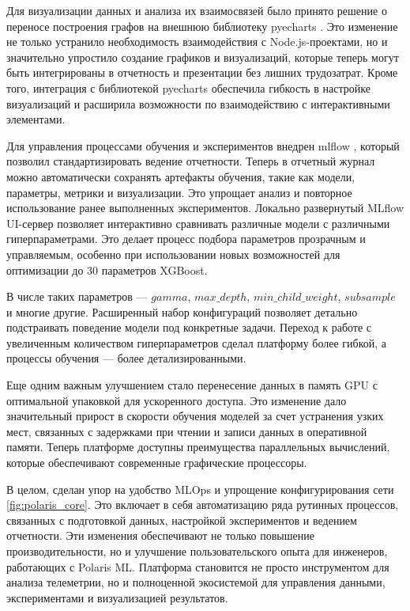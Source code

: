 \documentclass[14pt, a4paper]{src/bsu}
\begin{document}
Для визуализации данных и анализа их взаимосвязей было принято решение о
переносе построения графов на внешнюю библиотеку pyecharts
\cite{pyecharts_docs}. Это изменение не только устранило необходимость
взаимодействия с Node.js-проектами, но и значительно упростило создание
графиков и визуализаций, которые теперь могут быть интегрированы в отчетность и
презентации без лишних трудозатрат. Кроме того, интеграция с библиотекой
pyecharts обеспечила гибкость в настройке визуализаций и расширила возможности
по взаимодействию с интерактивными элементами.

Для управления процессами обучения и экспериментов внедрен mlflow
\cite{mlflow_docs}, который позволил стандартизировать ведение отчетности.
Теперь в отчетный журнал можно автоматически сохранять артефакты обучения,
такие как модели, параметры, метрики и визуализации. Это упрощает анализ и
повторное использование ранее выполненных экспериментов. Локально развернутый
MLflow UI-сервер позволяет интерактивно сравнивать различные модели с
различными гиперпараметрами. Это делает процесс подбора параметров прозрачным и
управляемым, особенно при использовании новых возможностей для оптимизации до
30 параметров XGBoost.

В числе таких параметров — $gamma$, $max\_depth$, $min\_child\_weight$,
$subsample$ и многие другие. Расширенный набор конфигураций позволяет детально
подстраивать поведение модели под конкретные задачи. Переход к работе с
увеличенным количеством гиперпараметров сделал платформу более гибкой, а
процессы обучения — более детализированными.

Еще одним важным улучшением стало перенесение данных в память GPU с оптимальной
упаковкой для ускоренного доступа. Это изменение дало значительный прирост в
скорости обучения моделей за счет устранения узких мест, связанных с задержками
при чтении и записи данных в оперативной памяти. Теперь платформе доступны
преимущества параллельных вычислений, которые обеспечивают современные
графические процессоры.

В целом, сделан упор на удобство MLOps и упрощение конфигурирования сети
\ref{fig:polaris_core}. Это включает в себя автоматизацию ряда рутинных
процессов, связанных с подготовкой данных, настройкой экспериментов и ведением
отчетности. Эти изменения обеспечивают не только повышение производительности,
но и улучшение пользовательского опыта для инженеров, работающих с Polaris ML.
Платформа становится не просто инструментом для анализа телеметрии, но и
полноценной экосистемой для управления данными, экспериментами и визуализацией
результатов.
\end{document}
